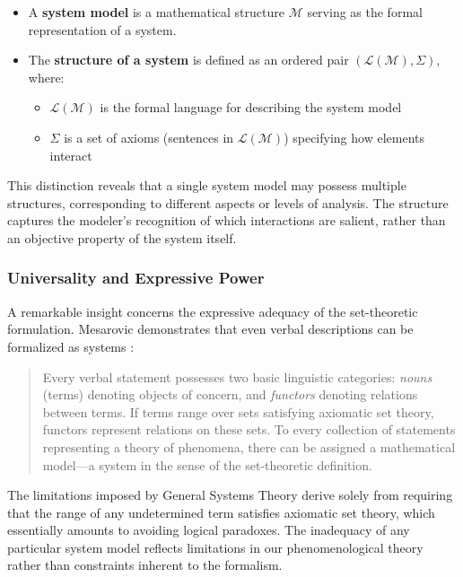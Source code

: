 \begin{itemize}
\item A \textbf{system model} is a mathematical structure $\mathcal{M}$ serving as the formal representation of a system.

\item The \textbf{structure of a system} is defined as an ordered pair $(\mathcal{L}(\mathcal{M}), \Sigma)$, where:
\begin{itemize}
\item $\mathcal{L}(\mathcal{M})$ is the formal language for describing the system model
\item $\Sigma$ is a set of axioms (sentences in $\mathcal{L}(\mathcal{M})$) specifying how elements interact
\end{itemize}
\end{itemize}

This distinction reveals that a single system model may possess multiple structures, corresponding to different aspects or levels of analysis. The structure captures the modeler's recognition of which interactions are salient, rather than an objective property of the system itself.

\subsubsection{Universality and Expressive Power}

A remarkable insight concerns the expressive adequacy of the set-theoretic formulation. Mesarovic demonstrates that even verbal descriptions can be formalized as systems \citep{mesarovic1972conceptual}:

\begin{quote}
Every verbal statement possesses two basic linguistic categories: \emph{nouns} (terms) denoting objects of concern, and \emph{functors} denoting relations between terms. If terms range over sets satisfying axiomatic set theory, functors represent relations on these sets. To every collection of statements representing a theory of phenomena, there can be assigned a mathematical model---a system in the sense of the set-theoretic definition.
\end{quote}

The limitations imposed by General Systems Theory derive solely from requiring that the range of any undetermined term satisfies axiomatic set theory, which essentially amounts to avoiding logical paradoxes. The inadequacy of any particular system model reflects limitations in our phenomenological theory rather than constraints inherent to the formalism.

